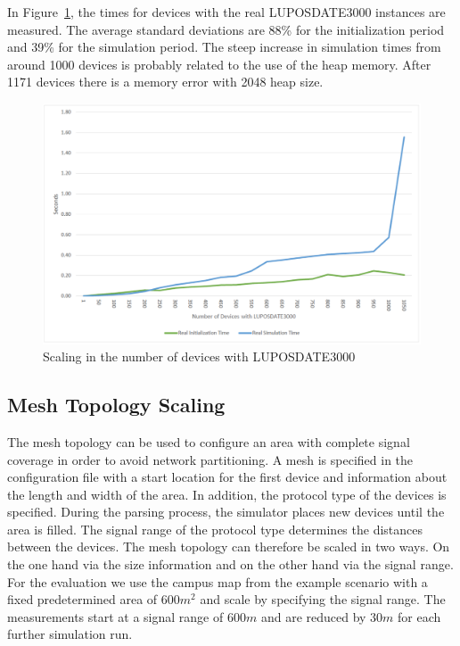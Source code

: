\documentclass[english,version-2019-11]{uzl-thesis}
\begin{document}
In Figure~\ref{figure_evaluation_starPerf_Lupos}, the times for devices with the real LUPOSDATE3000 instances are measured. The average standard deviations are 88\% for the initialization period and 39\% for the simulation period. The steep increase in simulation times from around 1000 devices is probably related to the use of the heap memory. After 1171 devices there is a memory error with 2048 heap size.
\begin{figure}[htpb]
  \centering
  \includegraphics[scale=0.5]{figure_evaluation_starPerf_Lupos.pdf}
  \caption{Scaling in the number of devices with LUPOSDATE3000}
  \label{figure_evaluation_starPerf_Lupos}
\end{figure}

\subsection{Mesh Topology Scaling}
The mesh topology can be used to configure an area with complete signal coverage in order to avoid network partitioning. A mesh is specified in the configuration file with a start location for the first device and information about the length and width of the area. In addition, the protocol type of the devices is specified. During the parsing process, the simulator places new devices until the area is filled.
The signal range of the protocol type determines the distances between the devices. The mesh topology can therefore be scaled in two ways. On the one hand via the size information and on the other hand via the signal range. For the evaluation we use the campus map from the example scenario with a fixed predetermined area of $600 m^2$ and scale by specifying the signal range. The measurements start at a signal range of $600 m$ and are reduced by $30 m$ for each further simulation run. 
\end{document}
